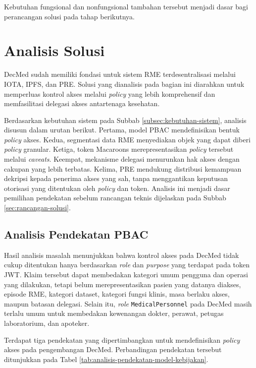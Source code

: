 \documentclass[bahasa, 12pt, a4paper, onecolumn, oneside, final]{report}
\begin{document}
Kebutuhan fungsional dan nonfungsional tambahan tersebut menjadi dasar bagi perancangan solusi pada tahap berikutnya.

\section{Analisis Solusi}
\label{sec:analisis-solusi}

DecMed sudah memiliki fondasi untuk sistem RME terdesentralisasi melalui IOTA, IPFS, dan PRE. Solusi yang dianalisis pada bagian ini diarahkan untuk memperluas kontrol akses melalui \textit{policy} yang lebih komprehensif dan memfasilitasi delegasi akses antartenaga kesehatan.

Berdasarkan kebutuhan sistem pada Subbab \ref{subsec:kebutuhan-sistem}, analisis disusun dalam urutan berikut. Pertama, model PBAC mendefinisikan bentuk \textit{policy} akses. Kedua, segmentasi data RME menyediakan objek yang dapat diberi \textit{policy} granular. Ketiga, token Macaroons merepresentasikan \textit{policy} tersebut melalui \textit{caveats}. Keempat, mekanisme delegasi menurunkan hak akses dengan cakupan yang lebih terbatas. Kelima, PRE mendukung distribusi kemampuan dekripsi kepada penerima akses yang sah, tanpa menggantikan keputusan otorisasi yang ditentukan oleh \textit{policy} dan token. Analisis ini menjadi dasar pemilihan pendekatan sebelum rancangan teknis dijelaskan pada Subbab \ref{sec:rancangan-solusi}.

\subsection{Analisis Pendekatan PBAC}
\label{subsec:analisis-pendekatan-model-pbac}

Hasil analisis masalah menunjukkan bahwa kontrol akses pada DecMed tidak cukup ditentukan hanya berdasarkan \textit{role} dan \textit{purpose} yang terdapat pada token JWT. Klaim tersebut dapat membedakan kategori umum pengguna dan operasi yang dilakukan, tetapi belum merepresentasikan pasien yang datanya diakses, episode RME, kategori dataset, kategori fungsi klinis, masa berlaku akses, maupun batasan delegasi. Selain itu, \textit{role} \texttt{MedicalPersonnel} pada DecMed masih terlalu umum untuk membedakan kewenangan dokter, perawat, petugas laboratorium, dan apoteker.

Terdapat tiga pendekatan yang dipertimbangkan untuk mendefinisikan \textit{policy} akses pada pengembangan DecMed. Perbandingan pendekatan tersebut ditunjukkan pada Tabel \ref{tab:analisis-pendekatan-model-kebijakan}.
\end{document}
